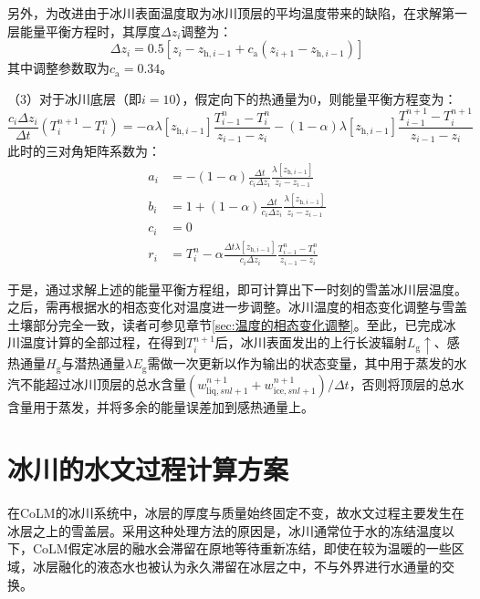 另外，为改进由于冰川表面温度取为冰川顶层的平均温度带来的缺陷，在求解第一层能量平衡方程时，其厚度$\Delta z_i$调整为：
\begin{equation}
  \Delta z_i = 0.5\left[z_i-z_{\mathrm{h},i-1}+c_{\mathrm {a}} \left(z_{i+1}-z_{\mathrm{h},i-1}\right)\right]
\end{equation}
其中调整参数取为$c_{\mathrm {a}} =0.34$。

（3）对于冰川底层（即$i=10$），假定向下的热通量为0，则能量平衡方程变为：
\begin{equation}
  \frac{c_{i} \Delta z_{i}}{\Delta t}\left(T_{i}^{n+1}-T_{i}^{n}\right)=-\alpha \lambda\left[z_{\mathrm{h},i-1}\right] \frac{T_{i-1}^{n}-T_{i}^{n}}{z_{i-1}-z_{i}}-(1-\alpha) \lambda\left[z_{\mathrm{h},i-1}\right] \frac{T_{i-1}^{n+1}-T_{i}^{n+1}}{z_{i-1}-z_{i}}
\end{equation}
此时的三对角矩阵系数为：
\begin{equation}
  \begin{aligned}
    a_{i} &= -(1-\alpha) \frac{\Delta t}{c_{i} \Delta z_{i}} \frac{\lambda\left[z_{\mathrm{h},i-1}\right]}{z_{i}-z_{i-1}} \\
    b_{i} &= 1+(1-\alpha) \frac{\Delta t}{c_{i} \Delta z_{i}} \frac{\lambda\left[z_{\mathrm{h},i-1}\right]}{z_{i}-z_{i-1}} \\
    c_{i} &= 0 \\
    r_{i} &= T_{i}^{n}-\alpha \frac{\Delta t \lambda\left[z_{\mathrm{h},i-1}\right]}{c_{i} \Delta z_{i}} \frac{T_{i-1}^{n}-T_{i}^{n}}{z_{i-1}-z_{i}}
  \end{aligned}
\end{equation}

于是，通过求解上述的能量平衡方程组，即可计算出下一时刻的雪盖冰川层温度。之后，需再根据水的相态变化对温度进一步调整。冰川温度的相态变化调整与雪盖土壤部分完全一致，读者可参见章节\ref{sec:温度的相态变化调整}。至此，已完成冰川温度计算的全部过程，在得到$T^{n+1}_i$后，冰川表面发出的上行长波辐射$L_{\mathrm {g}} \uparrow$、感热通量$H_{\mathrm {g}} $与潜热通量$\lambda E_{\mathrm {g}} $需做一次更新以作为输出的状态变量，其中用于蒸发的水汽不能超过冰川顶层的总水含量$\left(w^{n+1}_{\mathrm{liq},snl+1}+w^{n+1}_{\mathrm{ice},snl+1}\right)/\Delta t$，否则将顶层的总水含量用于蒸发，并将多余的能量误差加到感热通量上。


\section{冰川的水文过程计算方案}
在CoLM的冰川系统中，冰层的厚度与质量始终固定不变，故水文过程主要发生在冰层之上的雪盖层。采用这种处理方法的原因是，冰川通常位于水的冻结温度以下，CoLM假定冰层的融水会滞留在原地等待重新冻结，即使在较为温暖的一些区域，冰层融化的液态水也被认为永久滞留在冰层之中，不与外界进行水通量的交换。

